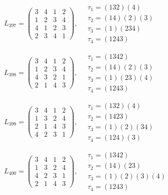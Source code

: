 $L_{397} = \begin{pmatrix} 3 & 4 & 1 & 2 \\ 1 & 2 & 3 & 4 \\ 4 & 1 & 2 & 3 \\ 2 & 3 & 4 & 1 \end{pmatrix}, \quad \begin{matrix} \tau_{1} = (1 3 2)(4) \\ \tau_{2} = (1 4)(2)(3) \\ \tau_{3} = (1)(2 3 4) \\ \tau_{4} = (1 2 4 3) \end{matrix}$

$L_{398} = \begin{pmatrix} 3 & 4 & 1 & 2 \\ 1 & 2 & 3 & 4 \\ 4 & 3 & 2 & 1 \\ 2 & 1 & 4 & 3 \end{pmatrix}, \quad \begin{matrix} \tau_{1} = (1 3 4 2) \\ \tau_{2} = (1 4)(2)(3) \\ \tau_{3} = (1)(2 3)(4) \\ \tau_{4} = (1 2 4 3) \end{matrix}$

$L_{399} = \begin{pmatrix} 3 & 4 & 1 & 2 \\ 1 & 3 & 2 & 4 \\ 2 & 1 & 4 & 3 \\ 4 & 2 & 3 & 1 \end{pmatrix}, \quad \begin{matrix} \tau_{1} = (1 3 2)(4) \\ \tau_{2} = (1 4 2 3) \\ \tau_{3} = (1)(2)(3 4) \\ \tau_{4} = (1 2 4)(3) \end{matrix}$

$L_{400} = \begin{pmatrix} 3 & 4 & 1 & 2 \\ 1 & 3 & 2 & 4 \\ 4 & 2 & 3 & 1 \\ 2 & 1 & 4 & 3 \end{pmatrix}, \quad \begin{matrix} \tau_{1} = (1 3 4 2) \\ \tau_{2} = (1 4)(2 3) \\ \tau_{3} = (1)(2)(3)(4) \\ \tau_{4} = (1 2 4 3) \end{matrix}$

